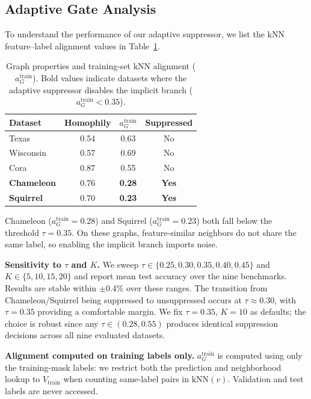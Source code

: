 \documentclass[letterpaper]{article}
\begin{document}
\subsection{Adaptive Gate Analysis}
To understand the performance of our adaptive suppressor, we list the kNN feature--label alignment values in Table~\ref{tab:knn_alignment}.

\begin{table}[h]
  \centering
  \caption{Graph properties and training-set kNN alignment ($a_G^{\mathrm{train}}$). Bold values indicate datasets where the adaptive suppressor disables the implicit branch ($a_G^{\mathrm{train}} < 0.35$).}
  \label{tab:knn_alignment}
  \footnotesize
  \begin{tabular}{lccc}
    \toprule
    Dataset & Homophily & $a_G^{\mathrm{train}}$ & Suppressed \\
    \midrule
    Texas & 0.54 & 0.63 & No \\
    Wisconsin & 0.57 & 0.69 & No \\
    Cora & 0.87 & 0.55 & No \\
    \textbf{Chameleon} & 0.76 & \textbf{0.28} & \textbf{Yes} \\
    \textbf{Squirrel} & 0.70 & \textbf{0.23} & \textbf{Yes} \\
    \bottomrule
  \end{tabular}
\end{table}

Chameleon ($a_G^{\mathrm{train}} = 0.28$) and Squirrel ($a_G^{\mathrm{train}} = 0.23$) both fall below the threshold $\tau = 0.35$. On these graphs, feature-similar neighbors do not share the same label, so enabling the implicit branch imports noise.

\textbf{Sensitivity to $\tau$ and $K$.}
We sweep $\tau \in \{0.25, 0.30, 0.35, 0.40, 0.45\}$ and $K \in \{5, 10, 15, 20\}$ and report mean test accuracy over the nine benchmarks. Results are stable within $\pm 0.4\%$ over these ranges. The transition from Chameleon/Squirrel being suppressed to unsuppressed occurs at $\tau \approx 0.30$, with $\tau = 0.35$ providing a comfortable margin. We fix $\tau = 0.35$, $K = 10$ as defaults; the choice is robust since any $\tau \in (0.28, 0.55)$ produces identical suppression decisions across all nine evaluated datasets.

\textbf{Alignment computed on training labels only.}
$a_G^{\mathrm{train}}$ is computed using only the training-mask labels: we restrict both the prediction and neighborhood lookup to $V_{\mathrm{train}}$ when counting same-label pairs in $\mathrm{kNN}(v)$. Validation and test labels are never accessed.
\end{document}
